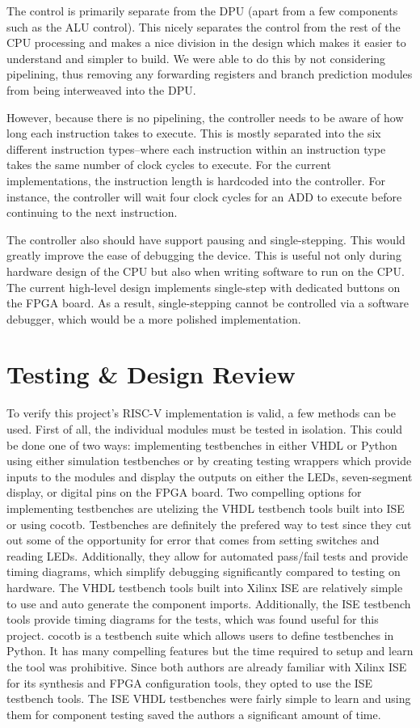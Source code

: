 \documentclass[lettersize,journal]{IEEEtran}
\begin{document}
The control is primarily separate from the DPU (apart from a few components such as the ALU control).
This nicely separates the control from the rest of the CPU processing and makes a nice division in the design which makes it easier to understand and simpler to build.
We were able to do this by not considering pipelining, thus removing any forwarding registers and branch prediction modules from being interweaved into the DPU.

However, because there is no pipelining, the controller needs to be aware of how long each instruction takes to execute.
This is mostly separated into the six different instruction types--where each instruction within an instruction type takes the same number of clock cycles to execute.
For the current implementations, the instruction length is hardcoded into the controller. For instance, the controller will wait four clock cycles for an ADD to execute
before continuing to the next instruction.

The controller also should have support pausing and single-stepping.
This would greatly improve the ease of debugging the device.
This is useful not only during hardware design of the CPU but also when writing software to run on the CPU.
The current high-level design implements single-step with dedicated buttons on the FPGA board.
As a result, single-stepping cannot be controlled via a software debugger, which would be a more polished implementation.

\section{Testing \& Design Review}
To verify this project's RISC-V implementation is valid, a few methods can be used. First of all, the individual modules must be tested in isolation.
This could be done one of two ways: implementing testbenches in either VHDL or Python using either simulation testbenches or by creating testing wrappers which provide inputs to the modules and display the outputs on either the LEDs, seven-segment display, or digital pins on the FPGA board.
Two compelling options for implementing testbenches are utelizing the VHDL testbench tools built into ISE or using cocotb.
Testbenches are definitely the prefered way to test since they cut out some of the opportunity for error that comes from setting switches and reading LEDs.
Additionally, they allow for automated pass/fail tests and provide timing diagrams, which simplify debugging significantly compared to testing on hardware.
The VHDL testbench tools built into Xilinx ISE are relatively simple to use and auto generate the component imports.
Additionally, the ISE testbench tools provide timing diagrams for the tests, which was found useful for this project.
cocotb is a testbench suite which allows users to define testbenches in Python.
It has many compelling features but the time required to setup and learn the tool was prohibitive.
Since both authors are already familiar with Xilinx ISE for its synthesis and FPGA configuration tools, they opted to use the ISE testbench tools.
The ISE VHDL testbenches were fairly simple to learn and using them for component testing saved the authors a significant amount of time.
\end{document}
